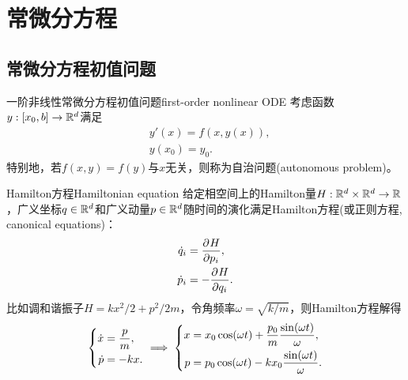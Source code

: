 \chapter{常微分方程}
\label{chap:ordinary differential equation}

\section{常微分方程初值问题}

\begin{definition}
    {一阶非线性常微分方程初值问题}{first-order nonlinear ODE}
    考虑函数$y:[x_0,b] \to \mathbb{R}^d$满足
    \begin{subequations}
        \label{eqn:ode}
        \begin{align}
            \label{eqn:ode eq}
            &y'(x) = f(x,y(x)),\\
            &y(x_0) = y_0.
        \end{align}
    \end{subequations}
    特别地，若$f(x,y) = f(y)$与$x$无关，则称为自治问题(autonomous problem)。
\end{definition}

\begin{example}
    {Hamilton方程}{Hamiltonian equation}
    给定相空间上的Hamilton量$H:\mathbb{R}^d \times \mathbb{R}^d \to \mathbb{R}$，广义坐标$q \in \mathbb{R}^d$和广义动量$p \in \mathbb{R}^d$随时间的演化满足Hamilton方程(或正则方程, canonical equations)：
    \begin{subequations}
        \begin{align}
            \dot q_i &= \frac{\partial^{}H}{\partial{p_i}^{}},\\
            \dot p_i &= -\frac{\partial^{}H}{\partial{q_i}^{}}.
        \end{align}
    \end{subequations}
    比如调和谐振子$H = kx^2/2 + p^2/2m$，令角频率$\omega = \sqrt{k/m}$，则Hamilton方程解得
    \[
        \left\{\begin{aligned}
            \dot x &= \frac pm,\\
            \dot p &= -kx.
        \end{aligned}\right. \implies
        \left\{\begin{aligned}
            x &= x_0\cos(\omega t) + \frac{p_0}m\frac{\sin(\omega t)}\omega,\\
            p &= p_0\cos(\omega t) - kx_0\frac{\sin(\omega t)}\omega.
        \end{aligned}\right.
    \]
\end{example}

